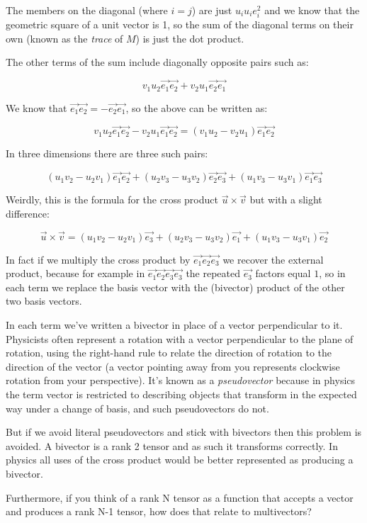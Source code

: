 The members on the diagonal (where $i=j$) are just $u_i u_i e_i^2$ and we know that the geometric square of a unit vector is 1, so the sum of the diagonal terms on their own (known as the \textit{trace} of $M$) is just the dot product.

The other terms of the sum include diagonally opposite pairs such as:

$$v_1u_2\vec{e_1}\vec{e_2} + v_2u_1\vec{e_2}\vec{e_1}$$

We know that $\vec{e_1}\vec{e_2} = -\vec{e_2}\vec{e_1}$, so the above can be written as:

$$
v_1u_2\vec{e_1}\vec{e_2} - v_2u_1\vec{e_1}\vec{e_2}
= (v_1u_2 - v_2u_1)\vec{e_1}\vec{e_2}
$$

In three dimensions there are three such pairs:

$$
(u_1v_2 - u_2v_1)\vec{e_1}\vec{e_2} +
(u_2v_3 - u_3v_2)\vec{e_2}\vec{e_3} +
(u_1v_3 - u_3v_1)\vec{e_1}\vec{e_3}
$$

Weirdly, this is the formula for the cross product $\vec{u} \times \vec{v}$ but with a slight difference:

$$
\vec{u} \times \vec{v} = (u_1v_2 - u_2v_1)\vec{e_3} +
(u_2v_3 - u_3v_2)\vec{e_1} +
(u_1v_3 - u_3v_1)\vec{e_2}
$$

In fact if we multiply the cross product by $\vec{e_1}\vec{e_2}\vec{e_3}$ we recover the external product, because for example in $\vec{e_1}\vec{e_2}\vec{e_3}\vec{e_3}$ the repeated $\vec{e_3}$ factors equal $1$, so in each term we replace the basis vector with the (bivector) product of the other two basis vectors.

In each term we've written a bivector in place of a vector perpendicular to it. Physicists often represent a rotation with a vector perpendicular to the plane of rotation, using the right-hand rule to relate the direction of rotation to the direction of the vector (a vector pointing away from you represents clockwise rotation from your perspective). It's known as a \textit{pseudovector} because in physics the term vector is restricted to describing objects that transform in the expected way under a change of basis, and such pseudovectors do not.

But if we avoid literal pseudovectors and stick with bivectors then this problem is avoided. A bivector is a rank 2 tensor and as such it transforms correctly. In physics all uses of the cross product would be better represented as producing a bivector.

Furthermore, if you think of a rank N tensor as a function that accepts a vector and produces a rank N-1 tensor, how does that relate to multivectors?


